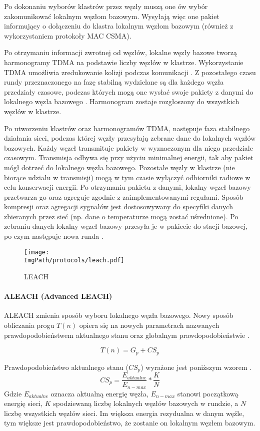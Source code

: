 Po dokonaniu wyborów klastrów przez węzły muszą one ów wybór zakomunikować lokalnym węzłom bazowym. Wysyłają więc one pakiet informujący o dołączeniu do klastra lokalnym węzłom bazowym (również z wykorzystaniem protokoły MAC CSMA).

Po otrzymaniu informacji zwrotnej od węzłów, lokalne węzły bazowe tworzą harmonogramy TDMA na podstawie liczby węzłów w klastrze. Wykorzystanie TDMA umożliwia zredukowanie kolizji podczas komunikacji \cite{Ilyas2004, Ergen2010}. Z pozostałego czasu rundy przeznaczonego na fazę stabilną wydzielane są dla każdego węzła przedziały czasowe, podczas których mogą one wysłać swoje pakiety z danymi do lokalnego węzła bazowego \cite{Cionca2008}. Harmonogram zostaje rozgłoszony do wszystkich węzłów w klastrze.

Po utworzeniu klastrów oraz harmonogramów TDMA, następuje faza stabilnego działania sieci, podczas której węzły przesyłają zebrane dane do lokalnych węzłów bazowych. Każdy węzeł transmituje pakiety w wyznaczonym dla niego przedziale czasowym. Transmisja odbywa się przy użyciu minimalnej energii, tak aby pakiet mógł dotrzeć do lokalnego węzła bazowego. Pozostałe węzły w klastrze (nie biorące udziału w transmisji) mogą w tym czasie wyłączyć odbiorniki radiowe w celu konserwacji energii. Po otrzymaniu pakietu z danymi, lokalny węzeł bazowy przetwarza go oraz agreguje zgodnie z zaimplementowanymi regułami. Sposób kompresji oraz agregacji sygnałów jest dostosowywany do specyfiki danych zbieranych przez sieć (np. dane o temperaturze mogą zostać uśrednione). Po zebraniu danych lokalny węzeł bazowy przesyła je w pakiecie do stacji bazowej, po czym następuje nowa runda \cite{Yadav2014}.
\begin{figure}[H]
	\begin{center}
		\texttt{[image: \\ImgPath/protocols/leach.pdf]}
	\end{center}
	\caption{LEACH}
\end{figure}
\paragraph{ALEACH (Advanced LEACH)} \label{para:aleach}
ALEACH zmienia sposób wyboru lokalnego węzła bazowego. Nowy sposób obliczania progu $T(n)$ opiera się na nowych parametrach nazwanych prawdopodobieństwem aktualnego stanu oraz globalnym prawdopodobieństwie \cite{Ali2008}.

\[
	T(n) = G_{p} + CS_{p}
\]

Prawdopodobieństwo aktualnego stanu ($CS_{p}$) wyrażone jest poniższym wzorem \cite{Ali2008}.
\[
	CS_{p} = \frac{E_{aktualne}}{E_{n-max}}*\frac{K}{N}
\]
Gdzie $E_{aktualne}$ oznacza aktualną energię węzła, $E_{n-max}$ stanowi początkową energię sieci, $K$ spodziewaną liczbę lokalnych węzłów bazowych w rundzie, a $N$ liczbę wszystkich węzłów sieci. Im większa energia rezydualna w danym węźle, tym większe jest prawdopodobieństwo, że zostanie on lokalnym węzłem bazowym.

